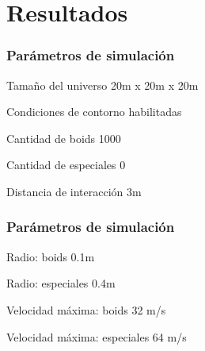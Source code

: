 \documentclass{beamer}
\begin{document}
    \section{Resultados}
        \begin{frame}
            \frametitle{Parámetros de simulación}
            \begin{block}{Tamaño del universo}
                20m x 20m x 20m
            \end{block}
            \begin{block}{Condiciones de contorno}
                habilitadas
            \end{block}
            \begin{block}{Cantidad de boids}
                1000
            \end{block}
            \begin{block}{Cantidad de especiales}
                0
            \end{block}
            \begin{block}{Distancia de interacción}
                3m
            \end{block}
        \end{frame}
        \begin{frame}
            \frametitle{Parámetros de simulación}
            \begin{block}{Radio: boids}
                0.1m
            \end{block}
            \begin{block}{Radio: especiales}
                0.4m
            \end{block}
            \begin{block}{Velocidad máxima: boids}
                32 m/s
            \end{block}
            \begin{block}{Velocidad máxima: especiales}
                64 m/s
            \end{block}
        \end{frame}
\end{document}
